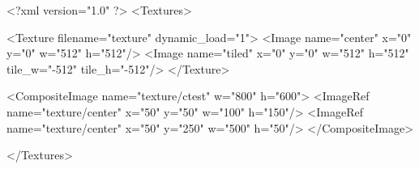 <?xml version="1.0" ?>
<Textures>

	<Texture filename="texture" dynamic_load="1">
		<Image name="center" x="0" y="0" w="512" h="512"/>
		<Image name="tiled" x="0" y="0" w="512" h="512" tile_w="-512" tile_h="-512"/>
    </Texture>
	
	<CompositeImage name="texture/ctest" w="800" h="600">
		<ImageRef name="texture/center" x="50" y="50" w="100" h="150"/>
		<ImageRef name="texture/center" x="50" y="250" w="500" h="50"/>
	</CompositeImage>

</Textures>
